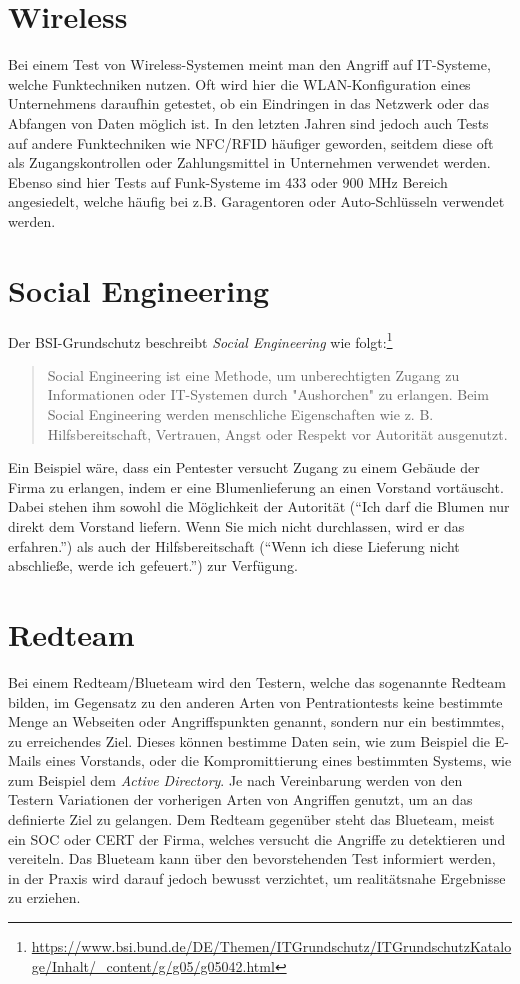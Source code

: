 	\section{Wireless}
	Bei einem Test von Wireless-Systemen meint man den Angriff auf IT-Systeme, welche Funktechniken nutzen. Oft wird hier die  WLAN-Konfiguration eines Unternehmens daraufhin getestet, ob ein Eindringen in das Netzwerk oder das Abfangen von Daten möglich ist. In den letzten Jahren sind jedoch auch Tests auf andere Funktechniken wie NFC/RFID häufiger geworden, seitdem diese oft als Zugangskontrollen oder Zahlungsmittel in Unternehmen verwendet werden. Ebenso sind hier Tests auf Funk-Systeme im 433 oder 900 MHz Bereich angesiedelt, welche häufig bei z.B. Garagentoren oder Auto-Schlüsseln verwendet werden.
	
	\section{Social Engineering}
	Der BSI-Grundschutz beschreibt \textit{Social Engineering} wie folgt:\footnote{\url{https://www.bsi.bund.de/DE/Themen/ITGrundschutz/ITGrundschutzKataloge/Inhalt/_content/g/g05/g05042.html}}
	\begin{quote}
Social Engineering ist eine Methode, um unberechtigten Zugang zu Informationen oder IT-Systemen durch "Aushorchen" zu erlangen. Beim Social Engineering werden menschliche Eigenschaften wie z. B. Hilfsbereitschaft, Vertrauen, Angst oder Respekt vor Autorität ausgenutzt. 
	\end{quote}

Ein Beispiel wäre, dass ein Pentester versucht Zugang zu einem Gebäude der Firma zu erlangen, indem er eine Blumenlieferung an einen Vorstand vortäuscht. Dabei stehen ihm sowohl die Möglichkeit der Autorität ("`Ich darf die Blumen nur direkt dem Vorstand liefern. Wenn Sie mich nicht durchlassen, wird er das erfahren."') als auch der Hilfsbereitschaft ("`Wenn ich diese Lieferung nicht abschließe, werde ich gefeuert."') zur Verfügung.

	\section{Redteam}
	Bei einem Redteam/Blueteam wird den Testern, welche das sogenannte Redteam bilden, im Gegensatz zu den anderen Arten von Pentrationtests keine bestimmte Menge an Webseiten oder Angriffspunkten genannt, sondern nur ein bestimmtes, zu erreichendes Ziel. Dieses können bestimme Daten sein, wie zum Beispiel die E-Mails eines Vorstands, oder die Kompromittierung eines bestimmten Systems, wie zum Beispiel dem \textit{Active Directory}. Je nach Vereinbarung werden von den Testern Variationen der vorherigen Arten von Angriffen genutzt, um an das definierte Ziel zu gelangen. Dem Redteam gegenüber steht das Blueteam, meist ein SOC oder CERT der Firma, welches versucht die Angriffe zu detektieren und vereiteln. Das Blueteam kann über den bevorstehenden Test informiert werden, in der Praxis wird darauf jedoch bewusst verzichtet, um realitätsnahe Ergebnisse zu erziehen.\\
	

	
	
	
	
	